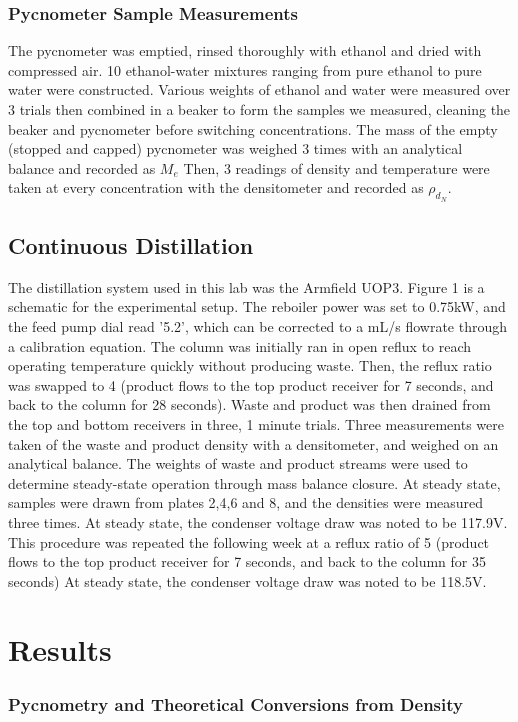 \documentclass[lettersize,journal]{IEEEtran}
\begin{document}
	\subsubsection{Pycnometer Sample Measurements}
	The pycnometer was emptied, rinsed thoroughly with ethanol and dried with compressed air. 10 ethanol-water mixtures ranging from pure ethanol to pure water were constructed. Various weights of ethanol and water were measured over 3 trials then combined in a beaker to form the samples we measured, cleaning the beaker and pycnometer before switching concentrations. The mass of the empty (stopped and capped) pycnometer was weighed 3 times with an analytical balance and recorded as $M_{e}$ Then, 3 readings of density and temperature were taken at every concentration with the densitometer and recorded as $\rho_{d_N}$.
	\subsection{Continuous Distillation}
	The distillation system used in this lab was the Armfield UOP3. Figure 1 is a schematic for the experimental setup. The reboiler power was set to 0.75kW, and the feed pump dial read '5.2', which can be corrected to a mL/s flowrate through a calibration equation. The column was initially ran in open reflux to reach operating temperature quickly without producing waste. Then, the reflux ratio was swapped to 4 (product flows to the top product receiver for 7 seconds, and back to the column for 28 seconds).  Waste and product was then drained from the top and bottom receivers in three, 1 minute trials. Three measurements were taken of the waste and product density with a densitometer, and weighed on an analytical balance. The weights of  waste and product streams were used to determine steady-state operation through mass balance closure. At steady state, samples were drawn from plates 2,4,6 and 8, and the densities were measured three times. At steady state, the condenser voltage draw was noted to be 117.9V.
	This procedure was repeated the following week at a reflux ratio of 5 (product flows to the top product receiver for 7 seconds, and back to the column for 35 seconds) At steady state, the condenser voltage draw was noted to be 118.5V.
	\section{Results}
	\subsubsection{Pycnometry and Theoretical Conversions from Density}
\end{document}
